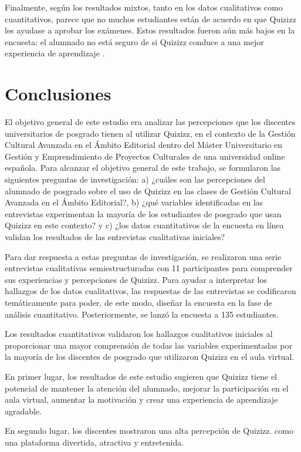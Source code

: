 \documentclass[spanish]{textolivre}
\begin{document}
Finalmente, según los resultados mixtos, tanto en los datos cualitativos como cuantitativos, parece que no muchos estudiantes están de acuerdo en que Quizizz les ayudase a aprobar los exámenes. Estos resultados fueron aún más bajos en la encuesta: el alumnado no está seguro de si Quizizz conduce a una mejor experiencia de aprendizaje \cite{dakka2015, mendez2013}.

\section{Conclusiones}\label{sec-5}
El objetivo general de este estudio era analizar las percepciones que los discentes universitarios de posgrado tienen al utilizar Quizizz, en el contexto de la Gestión Cultural Avanzada en el Ámbito Editorial dentro del Máster Universitario en Gestión y Emprendimiento de Proyectos Culturales de una universidad online española. Para alcanzar el objetivo general de este trabajo, se formularon las siguientes preguntas de investigación: a) ¿cuáles son las percepciones del alumnado de posgrado sobre el uso de Quizizz en las clases de Gestión Cultural Avanzada en el Ámbito Editorial?, b) ¿qué variables identificadas en las entrevistas experimentan la mayoría de los estudiantes de posgrado que usan Quizizz en este contexto? y c) ¿los datos cuantitativos de la encuesta en línea validan los resultados de las entrevistas cualitativas iniciales?

Para dar respuesta a estas preguntas de investigación, se realizaron una serie entrevistas cualitativas semiestructuradas con 11 participantes para comprender sus experiencias y percepciones de Quizizz. Para ayudar a interpretar los hallazgos de los datos cualitativos, las respuestas de las entrevistas se codificaron temáticamente para poder, de este modo, diseñar la encuesta en la fase de análisis cuantitativo. Posteriormente, se lanzó la encuesta a 135 estudiantes.

Los resultados cuantitativos validaron los hallazgos cualitativos iniciales al proporcionar una mayor comprensión de todas las variables experimentadas por la mayoría de los discentes de posgrado que utilizaron Quizizz en el aula virtual.

En primer lugar, los resultados de este estudio sugieren que Quizizz tiene el potencial de mantener la atención del alumnado, mejorar la participación en el aula virtual, aumentar la motivación y crear una experiencia de aprendizaje agradable.

En segundo lugar, los discentes mostraron una alta percepción de Quizizz. como una plataforma divertida, atractiva y entretenida.
\end{document}
